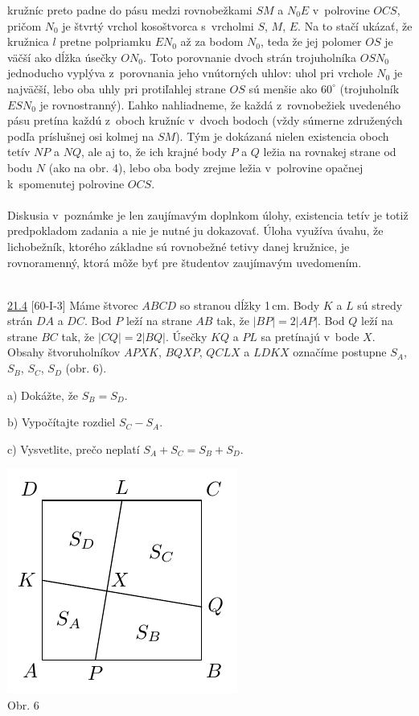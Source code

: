kružníc preto padne do pásu medzi rovnobežkami $SM$ a $N_0 E$ v~polrovine $OCS$, pričom $N_0$ je štvrtý vrchol kosoštvorca s~vrcholmi $S$, $M$, $E$. Na to stačí ukázať, že kružnica $l$ pretne polpriamku $EN_0$ až za bodom $N_0$, teda že jej polomer $OS$ je väčší ako dĺžka úsečky $ON_0$. Toto porovnanie dvoch strán trojuholníka $OSN_0$ jednoducho vyplýva z~porovnania jeho vnútorných uhlov: uhol pri vrchole $N_0$ je najväčší, lebo oba uhly pri protiľahlej strane $OS$ sú menšie ako $60^\circ$ (trojuholník $ESN_0$ je rovnostranný). Ľahko nahliadneme, že každá z~rovnobežiek uvedeného pásu pretína každú z~oboch kružníc v~dvoch bodoch (vždy súmerne združených podľa príslušnej osi kolmej na $SM$). Tým je dokázaná nielen existencia oboch tetív $NP$ a $NQ$, ale aj to, že ich krajné body $P$ a $Q$ ležia na rovnakej strane od bodu $N$ (ako na obr. 4), lebo oba body zrejme ležia v~polrovine opačnej k~spomenutej polrovine $OCS$.\\
\\
\kom Diskusia v~poznámke je len zaujímavým doplnkom úlohy, existencia tetív je totiž predpokladom zadania a nie je nutné ju dokazovať. Úloha využíva úvahu, že lichobežník, ktorého základne sú rovnobežné tetivy danej kružnice, je rovnoramenný, ktorá môže byť pre študentov zaujímavým uvedomením.\\
\\
\begin{tcolorbox}[breakable,notitle,boxrule=0pt,colback=light-gray,colframe=light-gray]\ul{21.4} [60-I-3]  Máme štvorec $ABCD$ so stranou dĺžky 1\,cm. Body $K$ a $L$ sú stredy strán $DA$ a $DC$. Bod $P$ leží na strane $AB$ tak, že $| BP | = 2 | AP |$. Bod $Q$ leží na strane $BC$ tak, že $| CQ | = 2 | BQ |$. Úsečky $KQ$ a $PL$ sa pretínajú v~bode $X$. Obsahy štvoruholníkov $APXK$, $BQXP$, $QCLX$ a $LDKX$ označíme postupne $S_A$, $S_B$, $S_C$, $S_D$ (obr. 6).

a) Dokážte, že $S_B = S_D$.

b) Vypočítajte rozdiel $S_C - S_A$.

c) Vysvetlite, prečo neplatí $S_A + S_C = S_B + S_D$.
\begin{center}
\includegraphics{obrazky/60D31}\\

Obr. 6
\end{center}
\end{tcolorbox}

